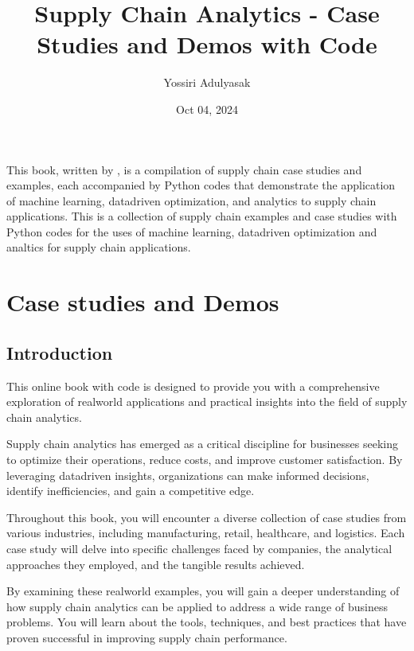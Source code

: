 \documentclass[letterpaper,10pt,english]{jupyterBook}
\title{Supply Chain Analytics - Case Studies and Demos with Code}
\date{Oct 04, 2024}
\author{Yossiri Adulyasak}
\begin{document}
\pagestyle{empty}
\sphinxmaketitle
\pagestyle{plain}
\sphinxtableofcontents
\pagestyle{normal}
\label{\detokenize{docs/index::doc}}


\sphinxAtStartPar
This book, written by , is a compilation of supply chain case studies and examples, each accompanied by Python codes that demonstrate the application of machine learning, data\sphinxhyphen{}driven optimization, and analytics to supply chain applications.
This is a collection of supply chain examples and case studies with Python codes for the uses of machine learning, data\sphinxhyphen{}driven optimization and analtics for supply chain applications.

\sphinxstepscope


\part{Case studies and Demos}

\sphinxstepscope


\chapter{Introduction}
\label{\detokenize{docs/introduction:introduction}}\label{\detokenize{docs/introduction::doc}}
\sphinxAtStartPar
This online book with code is designed to provide you with a comprehensive exploration of real\sphinxhyphen{}world applications and practical insights into the field of supply chain analytics.

\sphinxAtStartPar
Supply chain analytics has emerged as a critical discipline for businesses seeking to optimize their operations, reduce costs, and improve customer satisfaction. By leveraging data\sphinxhyphen{}driven insights, organizations can make informed decisions, identify inefficiencies, and gain a competitive edge.

\sphinxAtStartPar
Throughout this book, you will encounter a diverse collection of case studies from various industries, including manufacturing, retail, healthcare, and logistics. Each case study will delve into specific challenges faced by companies, the analytical approaches they employed, and the tangible results achieved.

\sphinxAtStartPar
By examining these real\sphinxhyphen{}world examples, you will gain a deeper understanding of how supply chain analytics can be applied to address a wide range of business problems. You will learn about the tools, techniques, and best practices that have proven successful in improving supply chain performance.
\end{document}

